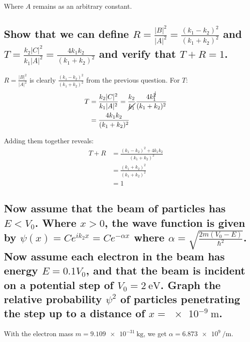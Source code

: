 \documentclass[a4paper]{scrartcl}
\begin{document}
Where \(A\) remains as an arbitrary constant.

\subsection{Show that we can define \(R = \frac{|B|^2}{|A|^2} = \frac{(k_1 - k_2)^2}{(k_1 + k_2)^2}\) and \(T = \frac{k_2 |C|^2}{k_1 |A|^2} = \frac{4 k_1 k_2}{(k_1 + k_2)^2}\) and verify that \(T + R = 1\).}
\(R = \frac{|B|^2}{|A|^2}\) is clearly \(\frac{(k_1 - k_2)^2}{(k_1 + k_2)^2}\) from the previous question. For \(T\):
\begin{align*}
    T &= \frac{k_2 |C|^2}{k_1 |A|^2} = \frac{k_2}{\cancel{k_1}} \frac{4 k_1^{\cancel{2}}}{(k_1 + k_2)^2} \\
    &= \frac{4 k_1 k_2}{(k_1 + k_2)^2}
\end{align*}

Adding them together reveals:
\begin{align*}
    T + R &= \frac{(k_1 - k_2)^2 + 4 k_1 k_2}{(k_1 + k_2)^2} \\
    &= \frac{(k_1 + k_2)^2}{(k_1 + k_2)^2} \\
    &= 1
\end{align*}

\subsection{Now assume that the beam of particles has \(E < V_0\). Where \(x > 0\), the wave function is given by \(\psi(x) = C e^{i k_2 x} = C e^{-\alpha x}\) where \(\alpha = \sqrt{\frac{2 m (V_0 - E)}{\hbar^2}}\). Now assume each electron in the beam has energy \(E = 0.1 V_0\), and that the beam is incident on a potential step of \(V_0 = \SI{2}{\electronvolt}\). Graph the relative probability \(\psi^2\) of particles penetrating the step up to a distance of \(x = \SI{e-9}{\metre}\).}
With the electron mass \(m = \SI{9.109e-31}{\kilo\gram}\), we get \(\alpha = \SI{6.873e9}{\per\metre}\).

\begin{figure}[h]
    \centering
\end{figure}
\end{document}
